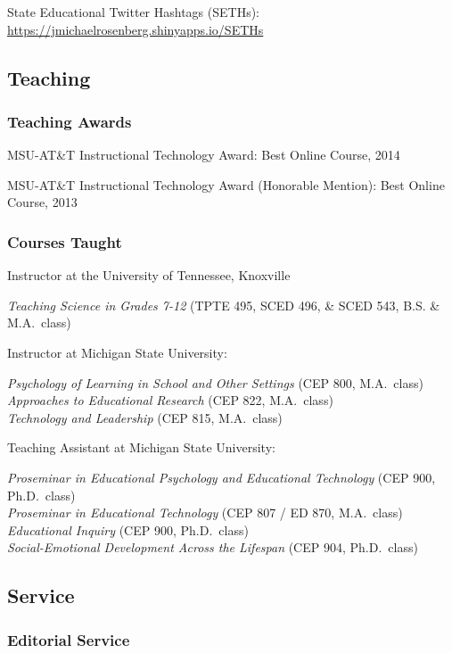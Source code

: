 \documentclass[]{article}
\begin{document}
State Educational Twitter Hashtags (SETHs):
\href{https://jmichaelrosenberg.shinyapps.io/SETHs/}{https://jmichaelrosenberg.shinyapps.io/SETHs}

\subsection{Teaching}\label{teaching}

\subsubsection{Teaching Awards}\label{teaching-awards}

MSU-AT\&T Instructional Technology Award: Best Online Course, 2014

MSU-AT\&T Instructional Technology Award (Honorable Mention): Best
Online Course, 2013

\subsubsection{Courses Taught}\label{courses-taught}

Instructor at the University of Tennessee, Knoxville

\emph{Teaching Science in Grades 7-12} (TPTE 495, SCED 496, \& SCED 543,
B.S. \& M.A.~class)

Instructor at Michigan State University:

\emph{Psychology of Learning in School and Other Settings} (CEP 800,
M.A.~class)\\
\emph{Approaches to Educational Research} (CEP 822, M.A.~class)\\
\emph{Technology and Leadership} (CEP 815, M.A.~class)

Teaching Assistant at Michigan State University:

\emph{Proseminar in Educational Psychology and Educational Technology}
(CEP 900, Ph.D.~class)\\
\emph{Proseminar in Educational Technology} (CEP 807 / ED 870,
M.A.~class)\\
\emph{Educational Inquiry} (CEP 900, Ph.D.~class)\\
\emph{Social-Emotional Development Across the Lifespan} (CEP 904,
Ph.D.~class)

\subsection{Service}\label{service}

\subsubsection{Editorial Service}\label{editorial-service}
\end{document}
